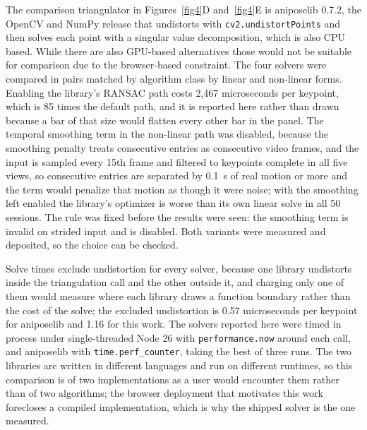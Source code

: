 \documentclass[pdflatex, sn-nature]{sn-jnl}
\theoremstyle{thmstyleone}%
\theoremstyle{thmstyletwo}%
\theoremstyle{thmstylethree}%
\begin{document}
The comparison triangulator in Figures~\ref{fig4}D and~\ref{fig4}E is aniposelib 0.7.2, the OpenCV and NumPy release that undistorts with \texttt{cv2.undistortPoints} and then solves each point with a singular value decomposition, which is also CPU based. While there are also GPU-based alternatives those would not be suitable for comparison due to the browser-based constraint. The four solvers were compared in pairs matched by algorithm class by linear and non-linear forms. Enabling the library's RANSAC path costs 2,467 microseconds per keypoint, which is 85 times the default path, and it is reported here rather than drawn because a bar of that size would flatten every other bar in the panel. The temporal smoothing term in the non-linear path was disabled, because the smoothing penalty treats consecutive entries as consecutive video frames, and the input is sampled every 15th frame and filtered to keypoints complete in all five views, so consecutive entries are separated by 0.1~s of real motion or more and the term would penalize that motion as though it were noise; with the smoothing left enabled the library's optimizer is worse than its own linear solve in all 50 sessions. The rule was fixed before the results were seen: the smoothing term is invalid on strided input and is disabled. Both variants were measured and deposited, so the choice can be checked.

Solve times exclude undistortion for every solver, because one library undistorts inside the triangulation call and the other outside it, and charging only one of them would measure where each library draws a function boundary rather than the cost of the solve; the excluded undistortion is 0.57 microseconds per keypoint for aniposelib and 1.16 for this work. The solvers reported here were timed in process under single-threaded Node 26 with \texttt{performance.now} around each call, and aniposelib with \texttt{time.perf\_counter}, taking the best of three runs. The two libraries are written in different languages and run on different runtimes, so this comparison is of two implementations as a user would encounter them rather than of two algorithms; the browser deployment that motivates this work forecloses a compiled implementation, which is why the shipped solver is the one measured.
\end{document}
